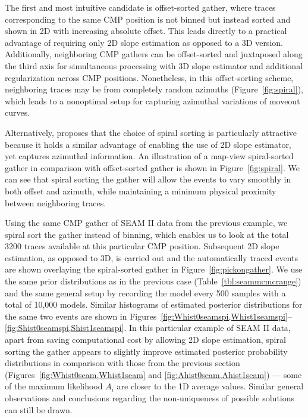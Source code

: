 The first and most intuitive candidate is offset-sorted gather, where traces corresponding to the same CMP position is not binned but instead sorted and shown in 2D with increasing absolute offset. This leads directly to a practical advantage of requiring only 2D slope estimation as opposed to a 3D version. Additionally, neighboring CMP gathers can be offset-sorted and juxtaposed along the third axis for simultaneous processing with 3D slope estimator and additional regularization across CMP positions. Nonetheless, in this offset-sorting scheme, neighboring traces may be from completely random azimuths (Figure~\ref{fig:spiral}), which leads to a nonoptimal setup for capturing azimuthal variations of moveout curves.


Alternatively, \cite{willthesis} proposes that the choice of spiral sorting is particularly attractive because it holds a similar advantage of enabling the use of 2D slope estimator, yet captures azimuthal information. An illustration of a map-view spiral-sorted gather in comparison with offset-sorted gather is shown in Figure~\ref{fig:spiral}. We can see that spiral sorting the gather will allow the events to vary smoothly in both offset and azimuth, while maintaining a minimum physical proximity between neighboring traces.


Using the same CMP gather of SEAM II data from the previous example, we spiral sort the gather instead of binning, which enables us to look at the total 3200 traces available at this particular CMP position. Subsequent 2D slope estimation, as opposed to 3D, is carried out and the automatically traced events are shown overlaying the spiral-sorted gather in Figure~\ref{fig:pickongather}. We use the same prior distributions as in the previous case (Table~\ref{tbl:seammcmcrange}) and the same general setup by recording the model every 500 samples with a total of 10,000 models. Similar histograms of estimated posterior distributions for the same two events are shown in Figures~\ref{fig:Whist0seamspi,Whist1seamspi}-- \ref{fig:Shist0seamspi,Shist1seamspi}. In this particular example of SEAM II data, apart from saving computational cost by allowing 2D slope estimation, spiral sorting the gather appears to slightly improve estimated posterior probability distributions in comparison with those from the previous section (Figures~\ref{fig:Whist0seam,Whist1seam} and \ref{fig:Ahist0seam,Ahist1seam}) --- some of the maximum likelihood $A_i$ are closer to the 1D average values. Similar general observations and conclusions regarding the non-uniqueness of possible solutions can still be drawn.

